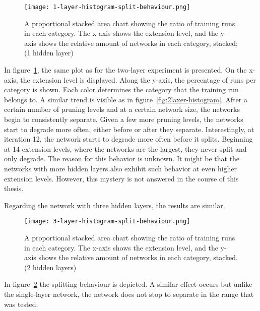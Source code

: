 \begin{figure}[ht] %
    \centering
    \texttt{[image: 1-layer-histogram-split-behaviour.png]}
    \caption[Separation/Degradation Stacked Area Chart (1 hidden layer)]{       
        A proportional stacked area chart showing the ratio of training runs in each category.
        The x-axis shows the extension level, and the y-axis shows the relative amount of networks in each category, stacked; (1 hidden layer)
        }\label{fig:1layer-histogram}
\end{figure}

In figure~\ref{fig:1layer-histogram}, the same plot as for the two-layer experiment is presented.
On the x-axis, the extension level is displayed. 
Along the y-axis, the percentage of runs per category is shown.
Each color determines the category that the training run belongs to.
A similar trend is visible as in figure~\ref{fig:2laxer-histogram}.
After a certain number of pruning levels and at a certain network size, the networks begin to consistently separate.
Given a few more pruning levels, the networks start to degrade more often, either before or after they separate.
Interestingly, at iteration 12, the network starts to degrade more often before it splits.
Beginning at 14 extension levels, where the networks are the largest, they never split and only degrade.
The reason for this behavior is unknown.
It might be that the networks with more hidden layers also exhibit such behavior at even higher extension levels. 
However, this mystery is not answered in the course of this thesis.

Regarding the network with three hidden layers, the results are similar.
\begin{figure}[ht] %
\centering
\texttt{[image: 3-layer-histogram-split-behaviour.png]}
\caption[Separation/Degradation Stacked Area Chart (3 hidden layers)]{
A proportional stacked area chart showing the ratio of training runs in each category.
The x-axis shows the extension level, and the y-axis shows the relative amount of networks in each category, stacked. (2 hidden layers)
}\label{fig:3layer-histogram}
\end{figure}
In figure~\ref{fig:3layer-histogram} the splitting behaviour is depicted.
A similar effect occurs but unlike the single-layer network, the network does not stop to separate in the range that was tested. 


